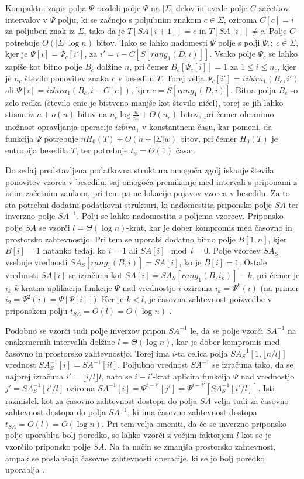 Kompaktni zapis polja $\Psi$ razdeli polje $\Psi$ na $|\Sigma|$ delov in uvede polje $C$ začetkov intervalov v $\Psi$ polju, ki se začnejo s poljubnim znakom $c\in\Sigma$, oziroma $C[c]=i$ za poljuben znak iz $\Sigma$, tako da je $T[SA[i+1]]=c$ in $T[SA[i]]\ne c$. Polje $C$ potrebuje $O(|\Sigma|\log{n})$ bitov. Tako se lahko nadomesti $\Psi$ polje s polji $\Psi_c;\:c\in\Sigma$, kjer je $\Psi[i]=\Psi_c[i']$, za $i'=i-C[S[rang_1(D,i)]]$. Vsako polje $\Psi_c$ se lahko zapiše kot bitno polje $B_c$ dolžine $n$, pri čemer $B_c[\Psi_c[i]]=1$ za $1 \le i \le n_c$, kjer je $n_c$ število ponovitev znaka $c$ v besedilu $T$. Torej velja $\Psi_c[i']=izbira_1(B_c,i')$ ali $\Psi[i]=izbira_1(B_c,i-C[c])$, kjer $c=S[rang_1(D,i)]$. Bitna polja $B_c$ so zelo redka (število enic je bistveno manjše kot število ničel), torej se jih lahko stisne iz $n+o(n)$ bitov na $n_c\log\frac{n}{n_c}+O(n_c)$ bitov, pri čemer ohranimo možnost opravljanja operacije $\textit{izbira}_1$ v konstantnem času, kar pomeni, da funkcija $\Psi$ potrebuje $nH_0(T)+O(n+|\Sigma|w)$ bitov, pri čemer $H_0(T)$ je entropija besedila $T$, ter potrebuje $t_\psi=O(1)$ časa \cite{Navarro2016}.

Do sedaj predstavljena podatkovna struktura omogoča zgolj iskanje števila ponovitev vzorca v besedilu, saj omogoča premikanje med intervali s priponami z istim začetnim zankom, pri tem pa ne lokacije pojavov vzorca v besedilu. Za to sta potrebni dodatni podatkovni strukturi, ki nadomestita priponsko polje $SA$ ter inverzno polje $SA^{-1}$. Polji se lahko nadomestita s poljema vzorcev. Priponsko polje $SA$ se vzorči $l=\Theta(\log{n})$-krat, kar je dober kompromis med časovno in prostorsko zahtevnostjo. Pri tem se uporabi dodatno bitno polje $B[1,n]$, kjer $B[i]=1$ natanko tedaj, ko $i=1$ ali $SA[i]\mod{l} =0$. Polje vzorcev $SA_S$ vsebuje vrednosti $SA_S[rang_1(B,i)]=SA[i]$, ko je $B[i]=1$. Ostale vrednosti $SA[i]$ se izračuna kot $SA[i]=SA_S[rang_1(B,i_k)]-k$, pri čemer je $i_k$ $k$-kratna aplikacija funkcije $\Psi$ nad vrednostjo $i$ oziroma $i_k=\Psi^k(i)$ (na primer $i_2=\Psi^2(i)=\Psi[\Psi[i]]$). Ker je $k< l$, je časovna zahtevnost poizvedbe v priponskem polju $t_{SA}=O(l)=O(\log{n})$ \cite{Navarro2016}.

Podobno se vzorči tudi polje inverzov pripon $SA^{-1}$ le, da se polje  vzorči $SA^{-1}$ na enakomernih intervalih dolžine $l=\Theta(\log{n})$, kar je dober kompromis med časovno in prostorsko zahtevnostjo. Torej ima $i$-ta celica polja $SA^{-1}_S[1,\lfloor n/l\rfloor]$ vrednost $SA^{-1}_S[i]=SA^{-1}[il]$. Poljubno vrednost $SA^{-1}$ se izračuna tako, da se najprej izračuna $i'=\lfloor i/l\rfloor l$, nato se $i-i'$-krat aplicira funkcija $\Psi$ nad vrednostjo $j'=SA^{-1}_S[i'/l]$ oziroma $SA^{-1}[i]=\Psi^{i-i'}[j']=\Psi^{i-i'}[SA^{-1}_S[i'/l]]$. Isti razmislek kot za časovno zahtevnost dostopa do polja $SA$ velja tudi za časovno zahtevnost dostopa do polja $SA^{-1}$, ki ima časovno zahtevnost dostopa $t_{SA}=O(l)=O(\log{n})$. Pri tem velja omeniti, da če se inverzno priponsko polje uporablja bolj poredko, se lahko vzorči z večjim faktorjem $l$ kot se je vzorčilo priponsko polje $SA$. Na ta način se zmanjša prostorsko zahtevnost, ampak se poslabšajo časovne zahtevnosti operacije, ki se jo bolj poredko uporablja \cite{Navarro2016}.

